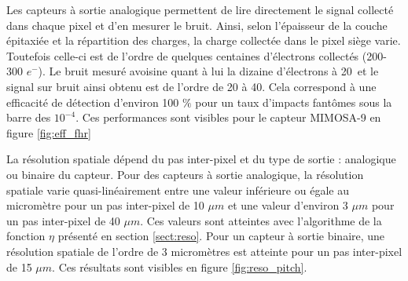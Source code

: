 %    
   
   Les capteurs \`a sortie analogique permettent de lire directement le signal collect\'e dans chaque pixel et d'en mesurer le bruit. Ainsi, selon l'\'epaisseur de la couche \'epitaxi\'ee et la r\'epartition des charges, la charge collect\'ee dans le pixel si\`ege varie. Toutefois celle-ci est de l'ordre de quelques centaines d'\'electrons collect\'es (200-300 $e^-$). Le bruit mesur\'e avoisine quant \`a lui la dizaine d'\'electrons \`a 20\textcelsius $\,$ et le signal sur bruit ainsi obtenu est de l'ordre de 20 \`a 40. Cela correspond \`a une efficacit\'e  de d\'etection d'environ 100 $\%$ pour un taux d'impacts fant\^omes sous la barre des $10^{-4}$. Ces performances sont visibles pour le capteur MIMOSA-9 en figure \ref{fig:eff_fhr}  
  
  \medskip
   
   La r\'esolution spatiale d\'epend du pas inter-pixel et du type de sortie : analogique ou binaire du capteur. Pour des capteurs \`a sortie analogique, la r\'esolution spatiale varie quasi-lin\'eairement entre une valeur inf\'erieure ou \'egale au microm\`etre pour un pas inter-pixel de 10 $\mu m$ et une valeur d'environ 3 $\mu m$ pour un pas inter-pixel de 40 $\mu m$. Ces valeurs sont atteintes avec l'algorithme de la fonction $\eta$ pr\'esent\'e en section \ref{sect:reso}. Pour un capteur \`a sortie binaire, une r\'esolution spatiale de l'ordre de 3 microm\`etres est atteinte pour un pas inter-pixel de 15 $\mu m$. Ces r\'esultats sont visibles en figure \ref{fig:reso_pitch}.
   
   \medskip
   
